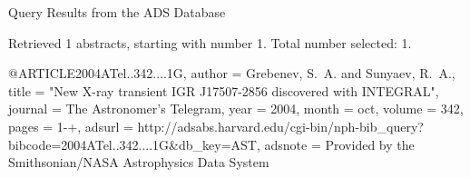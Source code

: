 Query Results from the ADS Database


Retrieved 1 abstracts, starting with number 1.  Total number selected: 1.

@ARTICLE{2004ATel..342....1G,
   author = {{Grebenev}, S.~A. and {Sunyaev}, R.~A.},
    title = "{New X-ray transient IGR J17507-2856 discovered with INTEGRAL}",
  journal = {The Astronomer's Telegram},
     year = 2004,
    month = oct,
   volume = 342,
    pages = {1-+},
   adsurl = {http://adsabs.harvard.edu/cgi-bin/nph-bib_query?bibcode=2004ATel..342....1G&db_key=AST},
  adsnote = {Provided by the Smithsonian/NASA Astrophysics Data System}
}


